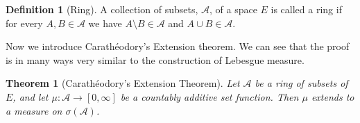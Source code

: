 \documentclass[
]{book}
\newtheorem{theorem}{Theorem}[chapter]
\theoremstyle{definition}
\newtheorem{definition}{Definition}[chapter]
\theoremstyle{definition}
\theoremstyle{definition}
\theoremstyle{definition}
\theoremstyle{remark}
\begin{document}
\begin{definition}[Ring]
A collection of subsets, \(\mathcal{A}\), of a space \(E\) is called a ring if for every \(A,B \in \mathcal{A}\) we have \(A \setminus B \in \mathcal{A}\) and \(A \cup B \in \mathcal{A}\).
\end{definition}

Now we introduce Carathéodory's Extension theorem. We can see that the proof is in many ways very similar to the construction of Lebesgue measure.

\begin{theorem}[Carathéodory's Extension Theorem]
Let \(\mathcal{A}\) be a ring of subsets of \(E\), and let \(\mu: \mathcal{A} \rightarrow [0, \infty]\) be a countably additive set function. Then \(\mu\) extends to a measure on \(\sigma(\mathcal{A})\).
\end{theorem}
\end{document}
